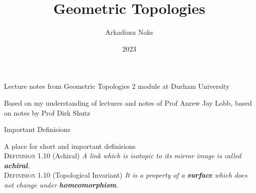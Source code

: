 \documentclass[12pt, letterpaper]{article}
\title{Geometric Topologies}
\author{Arkadiusz Naks}
\date{2023}
\begin{document}
\begin{titlepage}
  \begin{center}
    \makeatletter
    \vspace*{1cm}
    \Huge
    \textbf{\@title}

    \vspace{0.5cm}
    \Large
    Lecture notes from Geometric Topologies 2 module at Durham University

    \vspace{1.5cm}

    \textbf{\@author}

    \vfill

    \vspace{0.8cm}

    \small
    Based on my understanding of lectures and notes of Prof Anrew Jay Lobb,
    based on notes by Prof Dirk Shutz\\
    
    \@date{}
  \end{center}
\end{titlepage}

\tableofcontents
\newpage

\begin{section}{Important Definisions}

  A place for short and important definisions \\
  \textsc{Definision 1.10} (Achiral) \textit{A link which is isotopic to its
    mirror image is called \textbf{achiral}.} \\
  \textsc{Definision 1.10} (Topological Invariant) \textit{It is a property of
    a \textbf{surface} which does not change under \textbf{homeomorphism}.} \\

\end{section}
\end{document}
